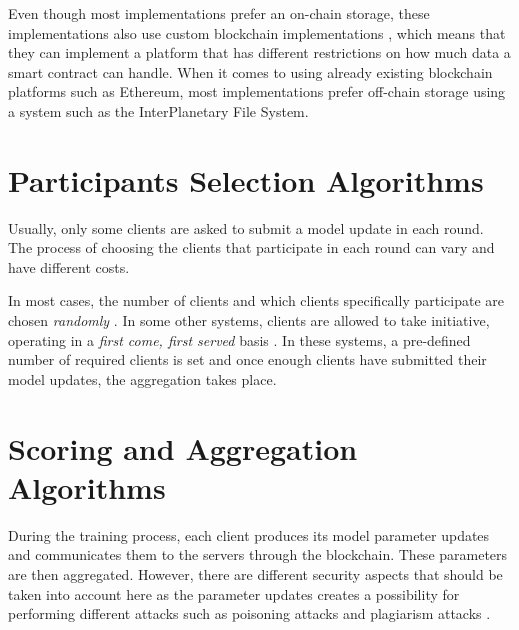 Even though most implementations prefer an on-chain storage, these implementations also use custom blockchain implementations \cite{8733825, 9524833, 8894364, 9184854, 8893114}, which means that they can implement a platform that has different restrictions on how much data a smart contract can handle. When it comes to using already existing blockchain platforms such as Ethereum, most implementations prefer off-chain storage using a system such as the InterPlanetary File System\cite{10.48550/arxiv.2007.03856, 8945913, Peyvandi2022, 9170559, 10.1145/3319535.3363256, 10.48550/arxiv.2011.07516}.

\section{Participants Selection Algorithms}\label{related_work:participants_selection}

Usually, only some clients are asked to submit a model update in each round. The process of choosing the clients that participate in each round can vary and have different costs.

In most cases, the number of clients and which clients specifically participate are chosen \textit{randomly} \cite{Peyvandi2022, demo, 9293091}. In some other systems, clients are allowed to take initiative, operating in a \textit{first come, first served} basis \cite{9184854, FANG20221}. In these systems, a pre-defined number of required clients is set and once enough clients have submitted their model updates, the aggregation takes place.

\section{Scoring and Aggregation Algorithms}\label{related_work:scoring_techniques}

During the training process, each client produces its model parameter updates and communicates them to the servers through the blockchain. These parameters are then aggregated. However, there are different security aspects that should be taken into account here as the parameter updates creates a possibility for performing different attacks such as poisoning attacks \cite{9134967} and plagiarism attacks \cite{10.48550/arxiv.2009.09338}.

